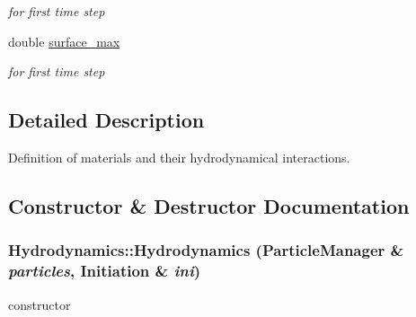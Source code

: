 \begin{CompactItemize}
\begin{CompactList}\small\item\em for first time step \item\end{CompactList}\item 
\hypertarget{classHydrodynamics_a1ead264a05af3f201e712d5d17abccb}{
double \hyperlink{classHydrodynamics_a1ead264a05af3f201e712d5d17abccb}{surface\_\-max}}
\label{classHydrodynamics_a1ead264a05af3f201e712d5d17abccb}

\begin{CompactList}\small\item\em for first time step \item\end{CompactList}\end{CompactItemize}


\subsection{Detailed Description}
Definition of materials and their hydrodynamical interactions. 

\subsection{Constructor \& Destructor Documentation}
\hypertarget{classHydrodynamics_837d2adb43e7d4ea4fa5a1c89bb59313}{
\subsubsection[{Hydrodynamics}]{\setlength{\rightskip}{0pt plus 5cm}Hydrodynamics::Hydrodynamics ({\bf ParticleManager} \& {\em particles}, \/  {\bf Initiation} \& {\em ini})}}
\label{classHydrodynamics_837d2adb43e7d4ea4fa5a1c89bb59313}


constructor 



